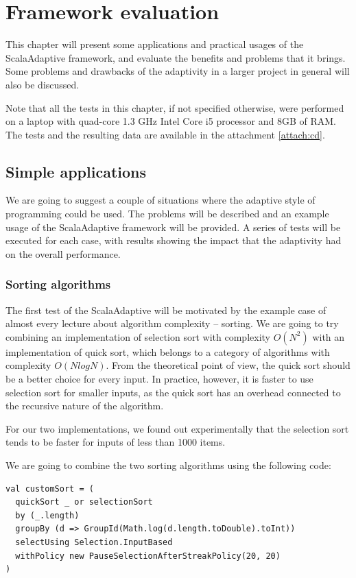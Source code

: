 \chapter{Framework evaluation}

This chapter will present some applications and practical usages of the ScalaAdaptive framework, and evaluate the benefits and problems that it brings. Some problems and drawbacks of the adaptivity in a larger project in general will also be discussed.

Note that all the tests in this chapter, if not specified otherwise, were performed on a laptop with quad-core 1.3 GHz Intel Core i5 processor and 8GB of RAM. The tests and the resulting data are available in the attachment \ref{attach:cd}.

\section{Simple applications}

We are going to suggest a couple of situations where the adaptive style of programming could be used. The problems will be described and an example usage of the ScalaAdaptive framework will be provided. A series of tests will be executed for each case, with results showing the impact that the adaptivity had on the overall performance.

\subsection{Sorting algorithms}

The first test of the ScalaAdaptive will be motivated by the example case of almost every lecture about algorithm complexity -- sorting. We are going to try combining an implementation of selection sort with complexity $O(N^2)$ with an implementation of quick sort, which belongs to a category of algorithms with complexity $O(N logN)$. From the theoretical point of view, the quick sort should be a better choice for every input. In practice, however, it is faster to use selection sort for smaller inputs, as the quick sort has an overhead connected to the recursive nature of the algorithm.

For our two implementations, we found out experimentally that the selection sort tends to be faster for inputs of less than 1000 items.

We are going to combine the two sorting algorithms using the following code:
\lstset{style=Scala}
\begin{lstlisting}
val customSort = (
  quickSort _ or selectionSort
  by (_.length) 
  groupBy (d => GroupId(Math.log(d.length.toDouble).toInt))
  selectUsing Selection.InputBased 
  withPolicy new PauseSelectionAfterStreakPolicy(20, 20)
)
\end{lstlisting}

